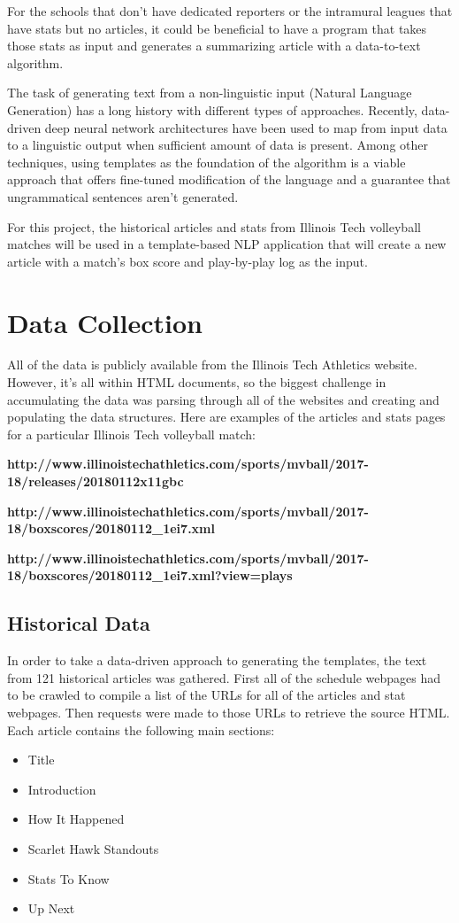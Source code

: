 \documentclass{article}
\begin{document}
For the schools that don't have dedicated reporters or the intramural leagues that have stats but no articles, it could be beneficial to have a program that takes those stats as input and generates a summarizing article with a data-to-text algorithm. 

The task of generating text from a non-linguistic input (Natural Language Generation) has a long history with different types of approaches. Recently, data-driven deep neural network architectures have been used to map from input data to a linguistic output when sufficient amount of data is present. Among other techniques, using templates as the foundation of the algorithm is a viable approach that offers fine-tuned modification of the language and a guarantee that ungrammatical sentences aren't generated. 

For this project, the historical articles and stats from Illinois Tech volleyball matches will be used in 
a template-based NLP application that will create a new article with a match's box score and play-by-play log as the input.

\section{Data Collection}

All of the data is publicly available from the Illinois Tech Athletics website. However, it's all within HTML documents, so the biggest challenge in accumulating the data was parsing through all of the websites and creating and populating the data structures.  Here are examples of the articles and stats pages for a particular Illinois Tech volleyball match:

\textbf{http://www.illinoistechathletics.com/sports/mvball/2017-18/releases/20180112x11gbc}

\textbf{http://www.illinoistechathletics.com/sports/mvball/2017-18/boxscores/20180112\_1ei7.xml}

\textbf{http://www.illinoistechathletics.com/sports/mvball/2017-18/boxscores/20180112\_1ei7.xml?view=plays}

\subsection{Historical Data}

In order to take a data-driven approach to generating the templates, the text from 121 historical articles was gathered. First all of the schedule webpages had to be crawled to compile a list of the URLs for all of the articles and stat webpages. Then requests were made to those URLs to retrieve the source HTML. Each article contains the following main sections: 
\begin{itemize}
\item Title
\item Introduction
\item How It Happened
\item Scarlet Hawk Standouts
\item Stats To Know
\item Up Next
\end{itemize}
\end{document}
